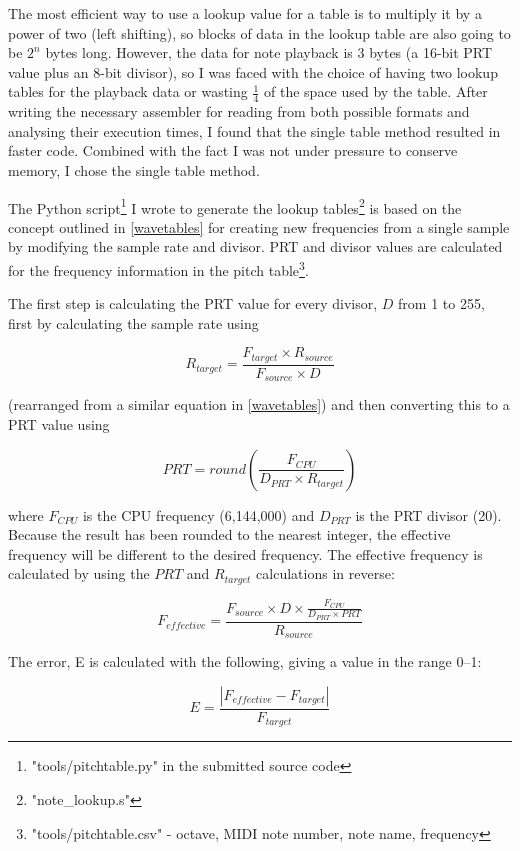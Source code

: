 The most efficient way to use a lookup value for a table is to multiply it by a power of two (left 
shifting), so blocks of data in the lookup table are also going to be $2^n$ bytes long.  However, 
the data for note playback is 3 bytes (a 16-bit PRT value plus an 8-bit divisor), so I was faced 
with the choice of having two lookup tables for the playback data or wasting $\frac{1}{4}$ of the 
space used by the table.  After writing the necessary assembler for reading from both possible 
formats and analysing their execution times, I found that the single table method resulted in faster 
code.  Combined with the fact I was not under pressure to conserve memory, I chose the single table 
method.

The Python script\footnote{"tools/pitchtable.py" in the submitted source code} I wrote to generate 
the lookup tables\footnote{"note\_lookup.s"} is based on the concept outlined in \ref{wavetables} 
for creating new frequencies from a single sample by modifying the sample rate and divisor.  PRT and 
divisor values are calculated for the frequency information in the pitch 
table\footnote{"tools/pitchtable.csv" - octave, MIDI note number, note name, frequency}.

The first step is calculating the PRT value for every divisor, $D$ from 1 to 255, first by 
calculating the sample rate using

\[R_{target} = \frac{F_{target} \times R_{source}}{F_{source} \times D}\]

(rearranged from a similar equation in \ref{wavetables}) and then converting this to a PRT value 
using

\[PRT = round\left(\frac{F_{CPU}}{D_{PRT}\times{}R_{target}}\right)\]

where $F_{CPU}$ is the CPU frequency (6,144,000) and $D_{PRT}$ is the PRT divisor (20).  Because the 
result has been rounded to the nearest integer, the effective frequency will be different to the 
desired frequency.  The effective frequency is calculated by using the $PRT$ and $R_{target}$ 
calculations in reverse:

\[F_{effective} = \frac{F_{source}\times{}D\times{}\frac{F_{CPU}}{D_{PRT}\times{}PRT}}{R_{source}}\]

The error, E is calculated with the following, giving a value in the range 0--1:

\[E = \frac{\left|F_{effective} - F_{target}\right|}{F_{target}}\]

